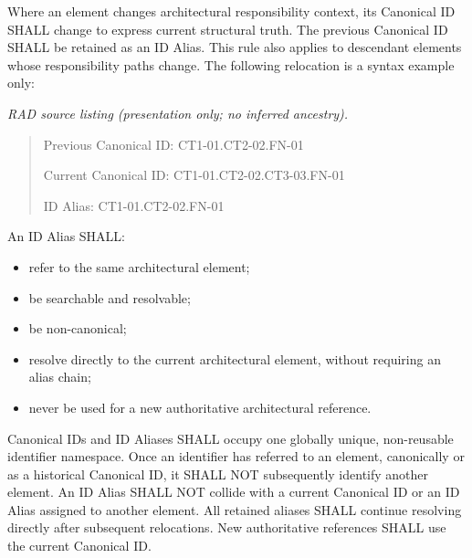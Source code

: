 Where an element changes architectural responsibility context, its Canonical ID SHALL change to express current structural truth. The previous Canonical ID SHALL be retained as an ID Alias. This rule also applies to descendant elements whose responsibility paths change. The following relocation is a syntax example only:

\label{rad:metamodel:401}

\textit{RAD source listing (presentation only; no inferred ancestry).}
\begin{quote}
Previous Canonical ID: CT1-01.CT2-02.FN-01

Current Canonical ID:  CT1-01.CT2-02.CT3-03.FN-01

ID Alias:              CT1-01.CT2-02.FN-01
\end{quote}
\label{rad:metamodel:407}

An ID Alias SHALL:

\label{rad:metamodel:409}

\begin{itemize}

\item
refer to the same architectural element;



\item
be searchable and resolvable;



\item
be non-canonical;



\item
resolve directly to the current architectural element, without requiring an alias chain;



\item
never be used for a new authoritative architectural reference.



\end{itemize}
\label{rad:metamodel:415}

Canonical IDs and ID Aliases SHALL occupy one globally unique, non-reusable identifier namespace. Once an identifier has referred to an element, canonically or as a historical Canonical ID, it SHALL NOT subsequently identify another element. An ID Alias SHALL NOT collide with a current Canonical ID or an ID Alias assigned to another element. All retained aliases SHALL continue resolving directly after subsequent relocations. New authoritative references SHALL use the current Canonical ID.

